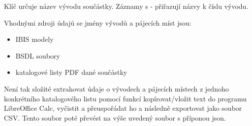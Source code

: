 \documentclass[letterpaper,10pt,czech]{sphinxmanual}
\begin{document}
\begin{sphinxVerbatim}[commandchars=\\\{\}]
        \PYG{p}{[} \PYG{p}{]} 
        \PYG{p}{[} \PYG{p}{]} 
\end{sphinxVerbatim}

Klíč určuje název vývodu součástky. Záznamy s - přiřazují názvy k číslu vývodu.

Vhodnými zdroji údajů se jmény vývodů a pájecích míst jsou:
\begin{itemize}
\item {} 
IBIS modely

\item {} 
BSDL soubory

\item {} 
katalogové listy PDF dané součástky

\end{itemize}

Není tak složité extrahovat údaje o vývodech a pájecích místech z jednoho konkrétního katalogového listu pomocí funkcí kopírovat/vložit text do programu LibreOffice Calc, vyčistit a přeuspořádat ho a následně
exportovat jako soubor CSV. Tento soubor poté převést na výše uvedený soubor s příponou json.
\end{document}
